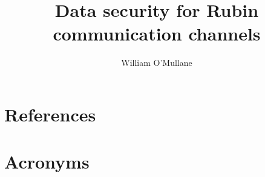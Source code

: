 \documentclass[DM,lsstdraft,authoryear,toc]{lsstdoc}
\title{Data security for Rubin communication channels}
\author{%
William O'Mullane
}
\date{\vcsDate}
\begin{document}
\mkshorttitle




\appendix
\section{References} \label{sec:bib}
\renewcommand{\refname}{} %


\section{Acronyms} \label{sec:acronyms}

\end{document}
